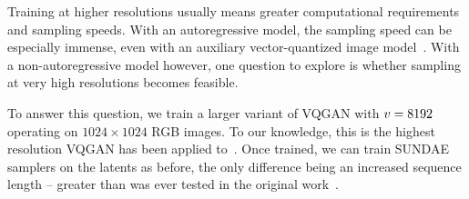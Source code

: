 Training at higher resolutions usually means greater computational requirements
and sampling speeds. With an autoregressive model, the sampling speed can be
especially immense, even with an auxiliary vector-quantized image
model~\cite{esser2021taming}. With a non-autoregressive model however, one
question to explore is whether sampling at very high resolutions becomes
feasible.

To answer this question, we train a larger variant of VQGAN with
$v = 8192$ operating on $1024 \times 1024$ RGB images. To our
knowledge, this is the highest resolution VQGAN has been applied
to~\cite{esser2021taming}. Once trained, we can train SUNDAE samplers on the
latents as before, the only difference being an increased sequence length --
greater than was ever tested in the original
work~\cite{savinov2022stepunrolled}.

\label{sec:megagan}
